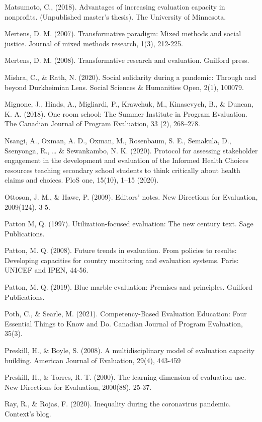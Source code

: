 \documentclass[
]{book}
\begin{document}
Matsumoto, C., (2018). Advantages of increasing evaluation capacity in nonprofits. (Unpublished master's thesis). The University of Minnesota.

Mertens, D. M. (2007). Transformative paradigm: Mixed methods and social justice. Journal of mixed methods research, 1(3), 212-225.

Mertens, D. M. (2008). Transformative research and evaluation. Guilford press.

Mishra, C., \& Rath, N. (2020). Social solidarity during a pandemic: Through and beyond Durkheimian Lens. Social Sciences \& Humanities Open, 2(1), 100079.

Mignone, J., Hinds, A., Migliardi, P., Krawchuk, M., Kinasevych, B., \& Duncan, K. A. (2018). One room school: The Summer Institute in Program Evaluation. The Canadian Journal of Program Evaluation, 33 (2), 268--278.

Nsangi, A., Oxman, A. D., Oxman, M., Rosenbaum, S. E., Semakula, D., Ssenyonga, R., \ldots{} \& Sewankambo, N. K. (2020). Protocol for assessing stakeholder engagement in the development and evaluation of the Informed Health Choices resources teaching secondary school students to think critically about health claims and choices. PloS one, 15(10), 1--15 (2020).

Ottoson, J. M., \& Hawe, P. (2009). Editors' notes. New Directions for Evaluation, 2009(124), 3-5.

Patton M, Q. (1997). Utilization-focused evaluation: The new century text. Sage Publications.

Patton, M. Q. (2008). Future trends in evaluation. From policies to results: Developing capacities for country monitoring and evaluation systems. Paris: UNICEF and IPEN, 44-56.

Patton, M. Q. (2019). Blue marble evaluation: Premises and principles. Guilford Publications.

Poth, C., \& Searle, M. (2021). Competency-Based Evaluation Education: Four Essential Things to Know and Do. Canadian Journal of Program Evaluation, 35(3).

Preskill, H., \& Boyle, S. (2008). A multidisciplinary model of evaluation capacity building. American Journal of Evaluation, 29(4), 443-459

Preskill, H., \& Torres, R. T. (2000). The learning dimension of evaluation use. New Directions for Evaluation, 2000(88), 25-37.

Ray, R., \& Rojas, F. (2020). Inequality during the coronavirus pandemic. Context's blog.
\end{document}
